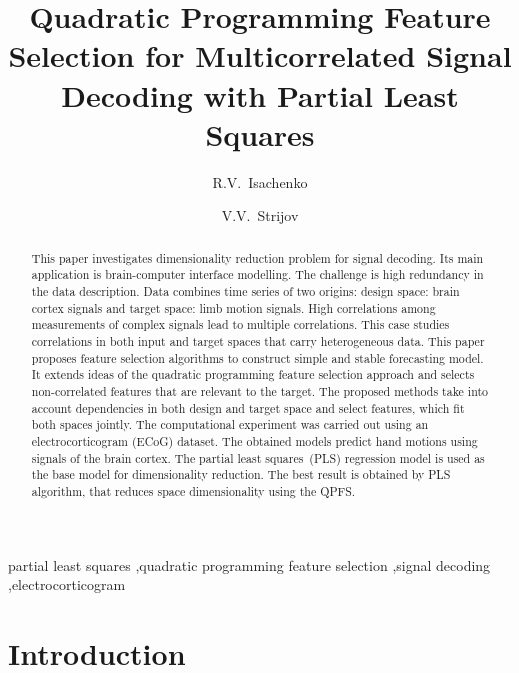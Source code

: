 \documentclass[preprint,authoryear,12pt]{elsarticle}
\theoremstyle{definition}
\begin{document}
	\begin{frontmatter}
		\title{Quadratic Programming Feature Selection for Multicorrelated Signal Decoding with Partial Least Squares}
		\author[mipt]{R.V.~Isachenko}
		\author[mipt]{V.V.~Strijov}
		
		\address[mipt]{
			Moscow Institute of Physics and Technology, 9 Institutskiy Per., Dolgoprudny, Moscow Region 141700, Russian Federation}
		
		\begin{abstract} 		
This paper investigates dimensionality reduction problem for signal decoding. Its main application is brain-computer interface modelling. The challenge is high redundancy in the data description. Data combines time series of two origins: design space: brain cortex signals and target space: limb motion signals.  High correlations among measurements of complex signals lead to multiple correlations. This case studies correlations in both input and target spaces that carry heterogeneous data. This paper proposes feature selection algorithms to construct simple and stable forecasting model. It extends ideas of the quadratic programming feature selection approach and selects non-correlated features that are relevant to the target. The proposed methods take into account  dependencies in both design and target space and select features, which fit both spaces jointly. The computational experiment was carried out using an electrocorticogram  (ECoG) dataset. The obtained models predict hand motions using signals of the brain cortex. The partial least squares~(PLS) regression model is used as the base model for dimensionality reduction. The best result is obtained by PLS algorithm, that reduces space dimensionality using the QPFS. 			
		\end{abstract}
		\begin{keyword}
			partial least squares \sep quadratic programming feature selection \sep signal decoding \sep electrocorticogram
		\end{keyword}
	\end{frontmatter}
\section{Introduction}
\end{document}
